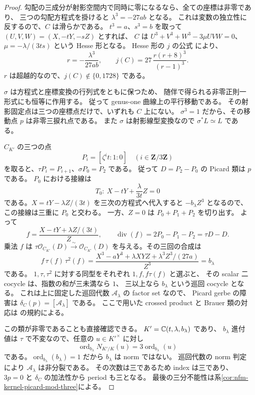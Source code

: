 \begin{proof}
勾配の三成分が射影空間内で同時に零になるなら、全ての座標は非零であり、
三つの勾配方程式を掛けると $\lambda^3=-27ab$ となる。
これは変数の独立性に反するので、$C$ は滑らかである。
$t^3=a$、$s^3=b$ を取って
$(U,V,W)=(X,-tY,-sZ)$ とすれば、
$C$ は $U^3+V^3+W^3-3\mu UVW=0$、
$\mu=-\lambda/(3ts)$ という Hesse 形となる。
Hesse 形の $j$ の公式
\cite[\S2.4]{NFMMatsunoElliptic}により、
\[
 r=-\frac{\lambda^3}{27ab},\qquad
 j(C)=27\,\frac{r(r+8)^3}{(r-1)^3}.
\]
$r$ は超越的なので、$j(C)\notin\{0,1728\}$ である。

$\sigma$ は方程式と座標変換の行列式をともに保つため、
随伴で得られる非零正則一形式にも恒等に作用する。
従って genus-one 曲線上の平行移動である。
その射影固定点は三つの座標点だけで、いずれも $C$ 上にない。
$\sigma^3=1$ だから、その移動点 $p$ は非零三捩れ点である。
また $\sigma$ は射影線型変換なので $\sigma^*L\simeq L$ である。

$C_{K'}$ の三つの点
\[
 P_i=[\zeta^i t:1:0]\quad(i\in\mathbf Z/3\mathbf Z)
\]
を取ると、$\tau P_i=P_{i+1}$、$\sigma P_0=P_2$ である。
従って $D=P_2-P_0$ の Picard 類は $p$ である。
$P_0$ における接線は
\[
 T_0:\ X-tY+\frac{\lambda}{3t}Z=0
\]
である。$X=tY-\lambda Z/(3t)$ を三次の方程式へ代入すると
$-b_\lambda Z^3$ となるので、この接線は三重に $P_0$ と交わる。
一方、$Z=0$ は $P_0+P_1+P_2$ を切り出す。
よって
\[
 f=\frac{X-tY+\lambda Z/(3t)}{Z},\qquad
 \operatorname{div}(f)=2P_0-P_1-P_2=\tau D-D.
\]
乗法 $f$ は
$\tau\mathcal O_{C_{K'}}(D)\xrightarrow{\sim}\mathcal O_{C_{K'}}(D)$
を与える。その三回の合成は
\[
 f\,\tau(f)\,\tau^2(f)
 =\frac{X^3-aY^3+\lambda XYZ+\lambda^3Z^3/(27a)}{Z^3}
 =b_\lambda
\]
である。
$1,\tau,\tau^2$ に対する同型をそれぞれ $1,f,f\tau(f)$ と選ぶと、
その scalar 二 cocycle は、指数の和が三未満なら $1$、
三以上なら $b_\lambda$ という巡回 cocycle となる。
これは上に固定した巡回代数 $\mathcal A_\lambda$ の factor set なので、
Picard gerbe の障害は $\delta_C(p)=[\mathcal A_\lambda]$ である。
ここで用いた crossed product と Brauer 類の対応は
\cite[IV, \S3, Theorem~3.14]{NFMMilneCFT}の規約による。

この類が非零であることも直接確認できる。
$K'=\mathbb C(t,\lambda,b_\lambda)$ であり、
$b_\lambda$ 進付値は $\tau$ で不変なので、任意の $u\in K'^\times$ に対し
\[
 \operatorname{ord}_{b_\lambda}N_{K'/K}(u)
      =3\operatorname{ord}_{b_\lambda}(u)
\]
である。$\operatorname{ord}_{b_\lambda}(b_\lambda)=1$ だから
$b_\lambda$ は norm ではない。
巡回代数の norm 判定
\cite[III, \S4, Steps~1--2]{NFMMilneCFT}により
$\mathcal A_\lambda$ は非分裂である。
その次数は三であるため index は三であり、
$3p=0$ と $\delta_C$ の加法性から period も三となる。
最後の三分不能性は系\ref{cor:nfm-kernel-picard-mod-three}による。
\end{proof}

